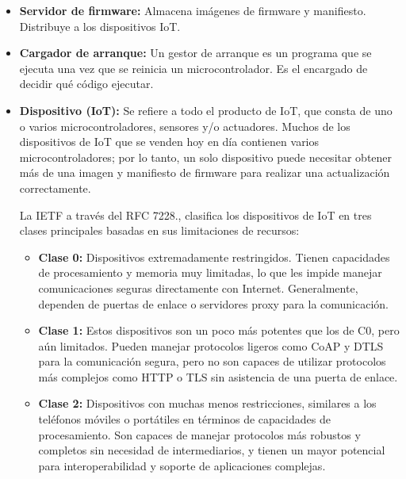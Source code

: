 \begin{itemize}
    \item \textbf{Servidor de firmware: } Almacena imágenes de firmware y manifiesto. Distribuye a los dispositivos IoT.
    \item \textbf{Cargador de arranque: } Un gestor de arranque es un programa que se ejecuta una vez que se reinicia un microcontrolador. Es el encargado de decidir qué código ejecutar.
\item \textbf{Dispositivo (IoT): } Se refiere a todo el producto de IoT, que consta de uno o varios microcontroladores, sensores y/o actuadores. Muchos de los dispositivos de IoT que se venden hoy en día contienen varios microcontroladores; por lo tanto, un solo dispositivo puede necesitar obtener más de una imagen y manifiesto de firmware para realizar una actualización correctamente.\cite{rfc9019}

La IETF a través del RFC 7228.\cite{rfc7228}, clasifica los dispositivos de IoT en tres clases principales basadas en sus limitaciones de recursos:

    \begin{itemize}
        \item \textbf{Clase 0: }Dispositivos extremadamente restringidos. Tienen capacidades de procesamiento y memoria muy limitadas, lo que les impide manejar comunicaciones seguras directamente con Internet. Generalmente, dependen de puertas de enlace o servidores proxy para la comunicación.
        \item \textbf{Clase 1: }Estos dispositivos son un poco más potentes que los de C0, pero aún limitados. Pueden manejar protocolos ligeros como CoAP y DTLS para la comunicación segura, pero no son capaces de utilizar protocolos más complejos como HTTP o TLS sin asistencia de una puerta de enlace.
        \item \textbf{Clase 2: }Dispositivos con muchas menos restricciones, similares a los teléfonos móviles o portátiles en términos de capacidades de procesamiento. Son capaces de manejar protocolos más robustos y completos sin necesidad de intermediarios, y tienen un mayor potencial para interoperabilidad y soporte de aplicaciones complejas.
    \end{itemize}


\end{itemize}
